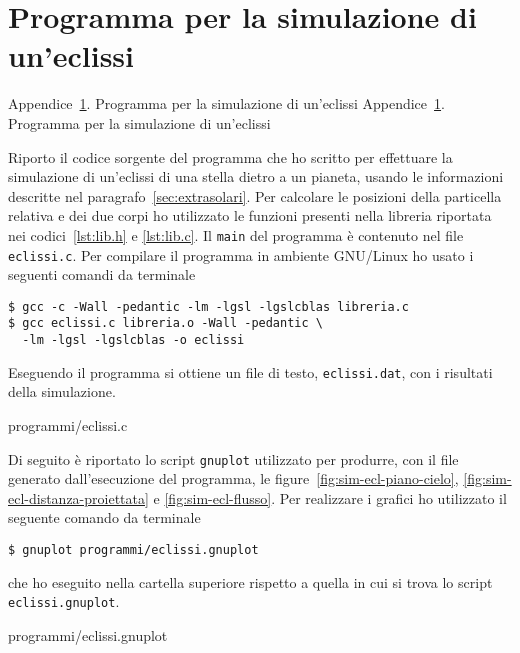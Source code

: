 \cleardoublepage{}
\chapter{Programma per la simulazione di un'eclissi}
\label{cha:simulazione-eclissi}
\markboth%
{Appendice~\ref{cha:simulazione-eclissi}. Programma per la simulazione di
  un'eclissi}%
{Appendice~\ref{cha:simulazione-eclissi}. Programma per la simulazione di
  un'eclissi}

Riporto il codice sorgente del programma che ho scritto per effettuare la
simulazione di un'eclissi di una stella dietro a un pianeta, usando le
informazioni descritte nel paragrafo~\ref{sec:extrasolari}. Per calcolare le
posizioni della particella relativa e dei due corpi ho utilizzato le funzioni
presenti nella libreria riportata nei codici~\ref{lst:lib.h} e
\ref{lst:lib.c}. Il \verb|main| del programma è contenuto nel file
\verb|eclissi.c|. Per compilare il programma in ambiente GNU/Linux ho usato i
seguenti comandi da terminale
\begin{verbatim}
$ gcc -c -Wall -pedantic -lm -lgsl -lgslcblas libreria.c
$ gcc eclissi.c libreria.o -Wall -pedantic \
  -lm -lgsl -lgslcblas -o eclissi
\end{verbatim}
Eseguendo il programma si ottiene un file di testo, \verb|eclissi.dat|, con i
risultati della simulazione.

{programmi/eclissi.c}

Di seguito è riportato lo script \verb|gnuplot| utilizzato per produrre, con il
file generato dall'esecuzione del programma, le
figure~\ref{fig:sim-ecl-piano-cielo}, \ref{fig:sim-ecl-distanza-proiettata} e
\ref{fig:sim-ecl-flusso}. Per realizzare i grafici ho utilizzato il seguente
comando da terminale
\begin{verbatim}
$ gnuplot programmi/eclissi.gnuplot
\end{verbatim}
che ho eseguito nella cartella superiore rispetto a quella in cui si trova lo
script \verb|eclissi.gnuplot|.

{programmi/eclissi.gnuplot}

